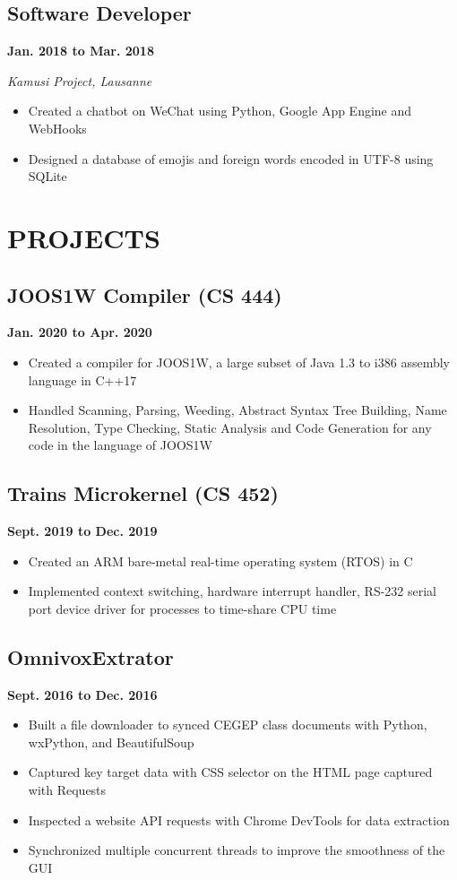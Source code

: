 \documentclass[12pt]{extarticle}
\begin{document}
\subsection*{Software Developer} \hfill \textbf{Jan. 2018 to Mar. 2018}

\textit{Kamusi Project, Lausanne}
\begin{itemize}
  \item Created a chatbot on WeChat using Python, Google App Engine and WebHooks
  \item Designed a database of emojis and foreign words encoded in UTF-8 using SQLite
\end{itemize}


\section*{PROJECTS}
\subsection*{JOOS1W Compiler (CS 444)} \hfill \textbf{Jan. 2020 to Apr. 2020}
\begin{itemize}
  \item Created a compiler for JOOS1W, a large subset of Java 1.3 to i386 assembly language in C++17
  \item Handled Scanning, Parsing, Weeding, Abstract Syntax Tree Building, Name Resolution, Type Checking, Static Analysis and Code Generation for any code in the language of JOOS1W
\end{itemize}

\subsection*{Trains Microkernel (CS 452)} \hfill \textbf{Sept. 2019 to Dec. 2019}
\begin{itemize}
  \item Created an ARM bare-metal real-time operating system (RTOS) in C
  \item Implemented context switching, hardware interrupt handler, RS-232 serial port device driver for processes to time-share CPU time
\end{itemize}

\subsection*{OmnivoxExtrator} \hfill \textbf{Sept. 2016 to Dec. 2016}
\begin{itemize}
  \item Built a file downloader to synced CEGEP class documents with Python, wxPython, and BeautifulSoup
  \item Captured key target data with CSS selector on the HTML page captured with Requests
  \item Inspected a website API requests with Chrome DevTools for data extraction
  \item Synchronized multiple concurrent threads to improve the smoothness of the GUI
\end{itemize}
\end{document}

